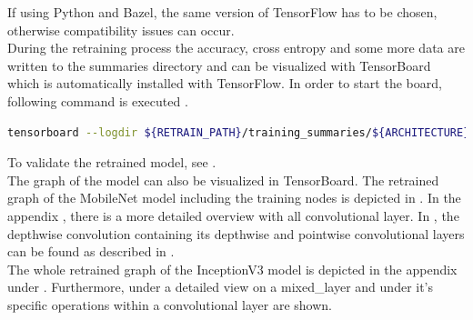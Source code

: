 If using Python and Bazel, the same version of TensorFlow has to be chosen, otherwise compatibility issues can occur. \\

During the retraining process the accuracy, cross entropy and some more data are written to the summaries directory and can be visualized with TensorBoard which is automatically installed with TensorFlow. In order to start the board, following command is executed .

\begin{minipage}{\linewidth}
\begin{lstlisting}[caption=Build and call of \textit{retrain}, label=list:tensorboard, language=bash]
	tensorboard --logdir ${RETRAIN_PATH}/training_summaries/${ARCHITECTURE}_${TRAINING_STEPS}/ &
\end{lstlisting}
\end{minipage}

To validate the retrained model, see . \\

The graph of the model can also be visualized in TensorBoard. The retrained graph of the MobileNet model including the training nodes is depicted in . In the appendix , there is a more detailed overview with all convolutional layer. In , the depthwise convolution containing its depthwise and pointwise convolutional layers can be found as described in . \\
The whole retrained graph of the InceptionV3 model is depicted in the appendix under . Furthermore, under  a detailed view on a mixed_layer and under  it's specific operations within a convolutional layer are shown. \\

